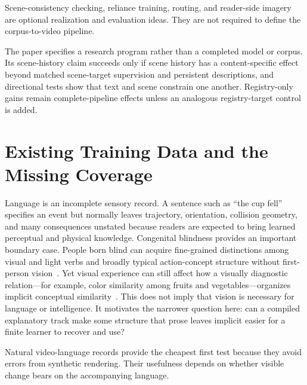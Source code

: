 \documentclass[11pt]{article}
\begin{document}
Scene-consistency checking, reliance training, routing, and reader-side imagery are optional realization and evaluation ideas. They are not required to define the corpus-to-video pipeline.

The paper specifies a research program rather than a completed model or corpus. Its scene-history claim succeeds only if scene history has a content-specific effect beyond matched scene-target supervision and persistent descriptions, and directional tests show that text and scene constrain one another. Registry-only gains remain complete-pipeline effects unless an analogous registry-target control is added.

\section{Existing Training Data and the Missing Coverage}
\label{sec:natural}

Language is an incomplete sensory record. A sentence such as ``the cup fell'' specifies an event but normally leaves trajectory, orientation, collision geometry, and many consequences unstated because readers are expected to bring learned perceptual and physical knowledge. Congenital blindness provides an important boundary case. People born blind can acquire fine-grained distinctions among visual and light verbs and broadly typical action-concept structure without first-person vision~\cite{bedny2012action,bedny2019sparkle}. Yet visual experience can still affect how a visually diagnostic relation---for example, color similarity among fruits and vegetables---organizes implicit conceptual similarity~\cite{connolly2007blindness}. This does not imply that vision is necessary for language or intelligence. It motivates the narrower question here: can a compiled explanatory track make some structure that prose leaves implicit easier for a finite learner to recover and use?

Natural video-language records provide the cheapest first test because they avoid errors from synthetic rendering. Their usefulness depends on whether visible change bears on the accompanying language.
\end{document}
